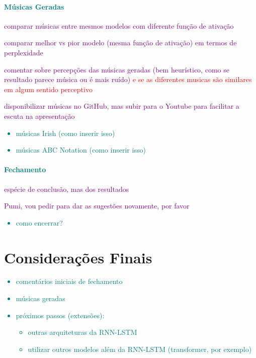\documentclass{automatextcc}
\newcommand{\obs}[1]{\textcolor{purple}{#1}}
\newcommand{\nico}[1]{\textcolor{teal}{#1}}
\newcommand{\pumi}[1]{\textcolor{red}{#1}}
\begin{document}
\subsubsection{\nico{Músicas Geradas}}

\obs{comparar músicas entre mesmos modelos com diferente função de ativação}

\obs{comparar melhor vs pior modelo (mesma função de ativação) em termos de perplexidade}

\obs{comentar sobre percepções das músicas geradas (bem heurístico, como se resultado parece música ou é mais ruído)} \pumi{e se as diferentes musicas são similares em algum sentido perceptivo}

\obs{disponibilizar músicas no GitHub, mas subir para o Youtube para facilitar a escuta na apresentação}

\nico{
\begin{itemize}
    \item músicas Irish (como inserir isso)
\end{itemize}
}

\nico{
\begin{itemize}
    \item músicas ABC Notation (como inserir isso)
\end{itemize}
}


\subsubsection{\nico{Fechamento}}

\obs{espécie de conclusão, mas dos resultados}

\obs{Pumi, vou pedir para dar as sugestões novamente, por favor}

\nico{
\begin{itemize}
    \item como encerrar?
\end{itemize}
}


\chapter{Considerações Finais}

\nico{
\begin{itemize}
    \item comentários iniciais de fechamento
    \item músicas geradas
    \item próximos passos (extensões):
    \begin{itemize}
        \item outras arquiteturas da RNN-LSTM
        \item utilizar outros modelos além da RNN-LSTM (transformer, por exemplo)
    \end{itemize}
\end{itemize}
}
\end{document}
